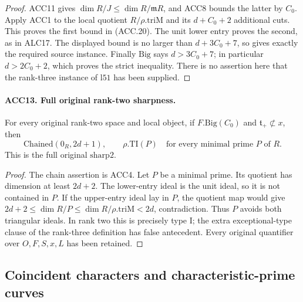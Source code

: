 \begin{proof}
ACC11 gives \(\dim R/J\le\dim R/\mathfrak mR\), and ACC8
bounds the latter by \(C_0\).  Apply ACC1 to the local quotient
\(R/\rho.\mathrm{triM}\) and its \(d+C_0+2\) additional
cuts.  This proves the first bound in (ACC.20).  The unit lower
entry proves the second, as in ALC17.  The displayed bound is no
larger than \(d+3C_0+7\), so gives exactly the required source
instance.  Finally \(\mathrm{Big}\) says \(d>3C_0+7\);
in particular \(d>2C_0+2\), which proves the strict inequality.
There is no assertion here that the rank-three instance of
\(\mathrm{l51}\) has been supplied.
\end{proof}

\paragraph{ACC13. Full original rank-two sharpness.}
\label{claim:ACC13}
For every original rank-two space and local object, if
\(F.\mathrm{Big}(C_0)\) and \(\mathfrak t_+\not\subset x\),
then
\[
 \mathrm{Chained}(0_R,2d+1),\qquad
       \rho.\mathrm{TI}(P)\quad\text{for every minimal prime }P
       \text{ of }R.                                     \tag{ACC.21}
\]
This is the full original \(\mathrm{sharp2}\).

\begin{proof}
The chain assertion is ACC4.  Let \(P\) be a minimal prime.
Its quotient has dimension at least \(2d+2\).  The lower-entry
ideal is the unit ideal, so it is not contained in \(P\).
If the upper-entry ideal lay in \(P\), the quotient map would
give
\(2d+2\le\dim R/P\le\dim R/\rho.\mathrm{triM}<2d\),
contradiction.  Thus \(P\) avoids both triangular ideals.
In rank two this is precisely type I; the extra exceptional-type
clause of the rank-three definition has false antecedent.  Every
original quantifier over \(O,F,S,x,L\) has been retained.
\end{proof}

\subsection{Coincident characters and characteristic-prime curves}


